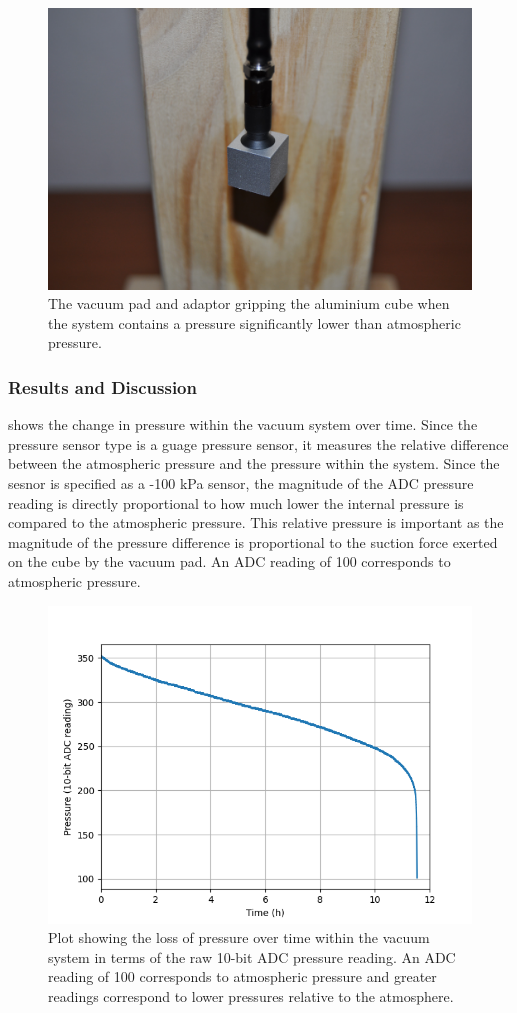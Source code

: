 \begin{figure}[!ht]
  \centering
  \includegraphics[width=0.6\linewidth]{figures/202105/end-effector-cube-grip.jpg}
  \caption{The vacuum pad and adaptor gripping the aluminium cube when the system contains a pressure significantly lower than atmospheric pressure.}
  \label{fig:end-effector-cube-grip}
\end{figure}

\subsubsection{Results and Discussion}

 shows the change in pressure within the vacuum system over time. Since the pressure sensor type is a guage pressure sensor, it measures the relative difference between the atmospheric pressure and the pressure within the system. Since the sesnor is specified as a -100 kPa sensor, the magnitude of the ADC pressure reading is directly proportional to how much lower the internal pressure is compared to the atmospheric pressure. This relative pressure is important as the magnitude of the pressure difference is proportional to the suction force exerted on the cube by the vacuum pad. An ADC reading of 100 corresponds to atmospheric pressure. 

\begin{figure}[!ht]
    \centering
    \includegraphics[width=0.7\linewidth]{figures/202105/end-effector-pressure-leak.png}
    \caption{Plot showing the loss of pressure over time within the vacuum system in terms of the raw 10-bit ADC pressure reading. An ADC reading of 100 corresponds to atmospheric pressure and greater readings correspond to lower pressures relative to the atmosphere.}
    \label{fig:end-effector-pressure-leak}
  \end{figure}

